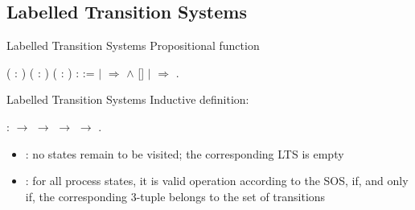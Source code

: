 \documentclass[t]{beamer}
\begin{document}
\subsection{Labelled Transition Systems}

\begin{frame}{Labelled Transition Systems}
	Propositional function 
	\vskip 0.1in
	\begin{coqdoccode}
		\coqdocnoindent
		  ( : ) ( : ) ( :  ) :  :=\coqdoceol
		\coqdocindent{1.00em}
		    \coqdoceol
		\coqdocindent{1.00em}
		\ensuremath{|}   \ensuremath{\Rightarrow}   \ensuremath{\land}    [] \coqdoceol
		\coqdocindent{1.00em}
		\ensuremath{|}  \ensuremath{\Rightarrow} \coqdoceol
		\coqdocindent{1.00em}
		.\coqdoceol
	\end{coqdoccode}
\end{frame}

\begin{frame}{Labelled Transition Systems}
	Inductive definition: \coqdocvar{ltsR'}
	\vskip 0.1in
	\begin{coqdoccode}
		\coqdocnoindent
		  :  \ensuremath{\rightarrow}   \ensuremath{\rightarrow}   \ensuremath{\rightarrow}   \ensuremath{\rightarrow} .\coqdoceol
	\end{coqdoccode}
	\vskip 0.2in
	\begin{itemize}
		\item {}: no states remain to be visited; the corresponding LTS is empty
		\item {}: for all process states, it is valid operation according to the SOS, if, and only if, the corresponding 3-tuple belongs to the set of transitions
	\end{itemize}
\end{frame}
\end{document}
